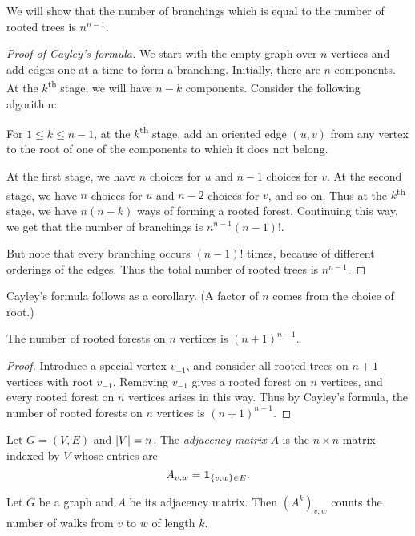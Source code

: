 We will show that the number of branchings which is equal to the number of
rooted trees is $n^{n-1}$.
\begin{proof}[Proof of Cayley's formula]
    We start with the empty graph over $n$ vertices and add edges one at a
    time to form a branching.
    Initially, there are $n$ components.
    At the $k$\textsuperscript{th} stage, we will have $n - k$ components.
    Consider the following algorithm:

    \begin{center}
        \begin{minipage}{0.8\textwidth}
            For $1 \le k \le n - 1$, at the $k$\textsuperscript{th} stage,
            add an oriented edge $(u, v)$ from any vertex to the root of
            one of the components to which it does not belong.
        \end{minipage}
    \end{center}

    At the first stage, we have $n$ choices for $u$ and $n-1$ choices for
    $v$.
    At the second stage, we have $n$ choices for $u$ and $n-2$ choices for
    $v$, and so on.
    Thus at the $k$\textsuperscript{th} stage, we have $n(n-k)$ ways of
    forming a rooted forest.
    Continuing this way, we get that the number of branchings is
    $n^{n-1} (n-1)!$.

    But note that every branching occurs $(n-1)!$ times, because of
    different orderings of the edges.
    Thus the total number of rooted trees is $n^{n-1}$.
\end{proof}
Cayley's formula follows as a corollary.
(A factor of $n$ comes from the choice of root.)

\begin{exercise}
    The number of rooted forests on $n$ vertices is $(n+1)^{n-1}$.
\end{exercise}
\begin{proof}
    Introduce a special vertex $v_{-1}$, and consider all rooted trees
    on $n+1$ vertices with root $v_{-1}$.
    Removing $v_{-1}$ gives a rooted forest on $n$ vertices, and every
    rooted forest on $n$ vertices arises in this way.
    Thus by Cayley's formula, the number of rooted forests on $n$
    vertices is $(n+1)^{n-1}$.
\end{proof}

\begin{definition}
    Let $G = (V, E)$ and $\abs{V} = n$.
    The \emph{adjacency matrix} $A$ is the $n \times n$ matrix indexed by
    $V$ whose entries are \[
        A_{v,w} = \1{\set{v, w} \in E}.
    \]
\end{definition}

\begin{proposition*}
    Let $G$ be a graph and $A$ be its adjacency matrix.
    Then $(A^k)_{v,w}$ counts the number of walks from $v$ to $w$ of length
    $k$.
\end{proposition*}
